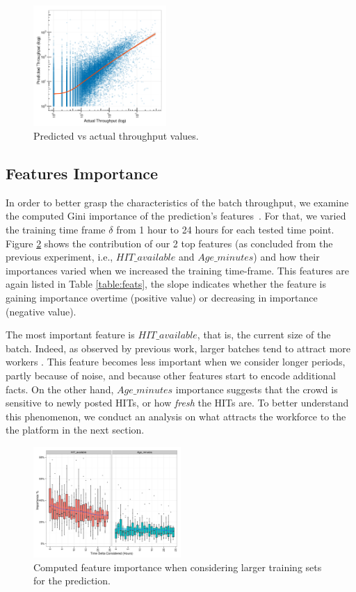 \begin{figure}[t!]
	\centering
		\includegraphics[width=0.45\textwidth]{figures/predictions_3}
	\caption{Predicted vs actual throughput values.}
	\label{fig:pred}
\end{figure}

\subsection{Features Importance}

In order to better grasp the characteristics of the batch throughput, we examine the computed Gini importance of the prediction's features~\cite{breiman}. 
For that, we varied the training time frame $\delta$ from 1 hour to 24 hours for each tested time point. 
Figure \ref{fig:importances} shows the contribution of our 2 top features (as concluded from the previous experiment, i.e., $HIT\_available$ and $Age\_minutes$) and how their importances varied when we increased the training time-frame. This features are again listed in Table \ref{table:feats}, the slope indicates whether the feature is gaining importance overtime (positive value) or decreasing in importance (negative value).

The most important feature is $HIT\_available$, that is, the current size of the batch. Indeed, as observed by previous work, larger batches tend to attract more workers \cite{mturk,crowddb}. This feature becomes less important when we consider longer periods, partly because of noise, and because other features start to encode additional facts.
On the other hand, $Age\_minutes$ importance suggests that the crowd is sensitive to newly posted HITs, or how \emph{fresh} the HITs are. 
To better understand this phenomenon, we conduct an analysis on what attracts the workforce to the the platform in the next section.

\begin{figure}[t!]
	\centering
		\includegraphics[width=0.5\textwidth]{figures/importances}
	\caption{Computed feature importance when considering larger training sets for the prediction.}
	\label{fig:importances}
\end{figure}

